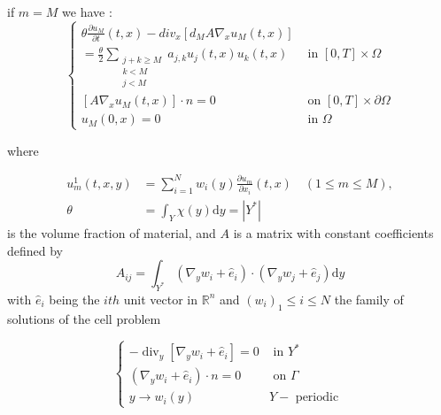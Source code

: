 \begin{theorem}
if $m=M$ we have :
\begin{equation}
  \begin{cases}\theta \frac{\partial u_{M}}{\partial t}(t, x)-d i v_{x}\left[d_{M} A \nabla_{x} u_{M}(t, x)\right] & \\ =\frac{\theta}{2} \sum_{\substack{j+k \geq M \\ k<M \\ j<M}} a_{j, k} u_{j}(t, x) u_{k}(t, x) & \text { in }[0, T] \times \Omega \\ {\left[A \nabla_{x} u_{M}(t, x)\right] \cdot n=0} & \text { on }[0, T] \times \partial \Omega \\ u_{M}(0, x)=0 & \text { in } \Omega\end{cases}
\label{eq 18}\end{equation}

where

$$
\begin{aligned}
u_{m}^{1}(t, x, y) &=\sum_{i=1}^{N} w_{i}(y) \frac{\partial u_{m}}{\partial x_{i}}(t, x) \quad(1 \leq m \leq M), \\
\theta &=\int_{Y} \chi(y) \mathrm{d} y=\left|Y^{*}\right|
\end{aligned}
$$
is the volume fraction of material, and $A$ is a matrix with constant coefficients defined by
\begin{equation*}
A_{i j}=\int_{Y^{*}}\left(\nabla_{y} w_{i}+\hat{e}_{i}\right) \cdot\left(\nabla_{y} w_{j}+\hat{e}_{j}\right) \mathrm{d} y\end{equation*}
with  $\hat{e}_{i}$ being the $ith$ unit vector in $\mathbb{R}^n$ and $(w_i)_1\leq i \leq N$ the family of solutions of the cell problem

\begin{equation}
    \begin{cases}
        -\operatorname{div}_{y}\left[\nabla_{y} w_{i}+\hat{e}_{i}\right]=0 & \text { in } Y^{*} \\
        \left(\nabla_{y} w_{i}+\hat{e}_{i}\right) \cdot n=0 & \text { on } \Gamma \\
        y \rightarrow w_{i}(y) & Y-\text { periodic }
    \end{cases}
    \label{eq 19}
\end{equation}
\label{thm 5.1}
\end{theorem}
